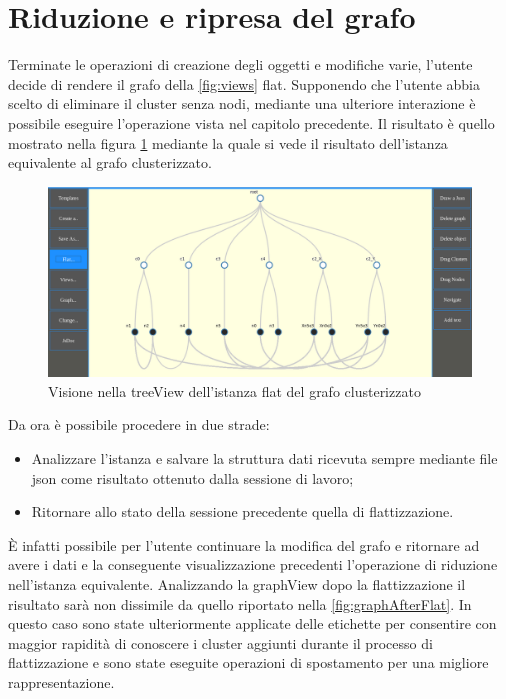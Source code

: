 \section{Riduzione e ripresa del grafo}
Terminate le operazioni di creazione degli oggetti e modifiche varie, l'utente decide di rendere il grafo della \figurename{\ref{fig:views}} flat. Supponendo che l'utente abbia scelto di eliminare il cluster senza nodi, mediante una ulteriore interazione è possibile eseguire l'operazione vista nel capitolo precedente. Il risultato è quello mostrato nella figura \figurename{\ref{fig:treeAfterFlat}} mediante la quale si vede il risultato dell'istanza equivalente al grafo clusterizzato.
\begin{figure}[!htb]
	\begin{center}
		\includegraphics[width=0.8 \linewidth]{figure/treeAfterFlat}
	\end{center}
	\caption{Visione nella treeView dell'istanza flat del grafo clusterizzato\label{fig:treeAfterFlat}}
\end{figure}
Da ora è possibile procedere in due strade:
\begin{itemize}
	\item Analizzare l'istanza e salvare la struttura dati ricevuta sempre mediante file json come risultato ottenuto dalla sessione di lavoro;
	\item Ritornare allo stato della sessione precedente quella di flattizzazione.
\end{itemize}

È infatti possibile per l'utente continuare la modifica del grafo e ritornare ad avere i dati e la conseguente visualizzazione precedenti l'operazione di riduzione nell'istanza equivalente. Analizzando la graphView dopo la flattizzazione il risultato sarà non dissimile da quello riportato nella \figurename{\ref{fig:graphAfterFlat}}. In questo caso sono state ulteriormente applicate delle etichette per consentire con maggior rapidità di conoscere i cluster aggiunti durante il processo di flattizzazione e sono state eseguite operazioni di spostamento per una migliore rappresentazione.

